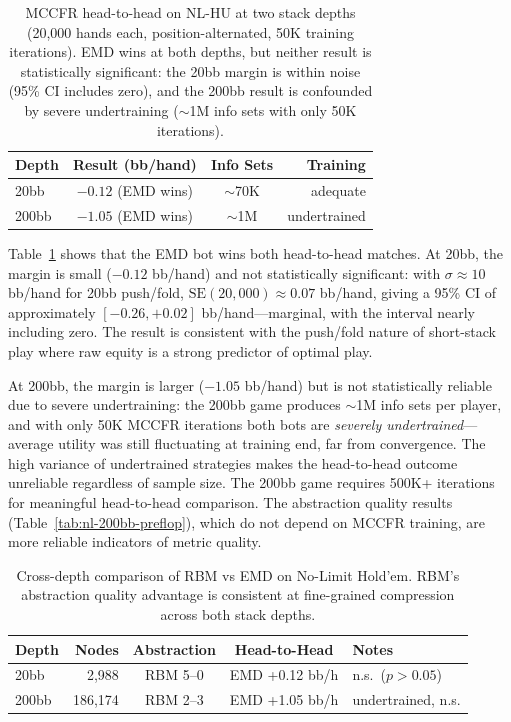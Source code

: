\documentclass[11pt]{article}
\begin{document}
\begin{table}[t]
\centering
\caption{MCCFR head-to-head on NL-HU at two stack depths (20{,}000
hands each, position-alternated, 50K training iterations). EMD wins at
both depths, but neither result is statistically significant: the 20bb
margin is within noise (95\% CI includes zero), and the 200bb result is
confounded by severe undertraining (${\sim}$1M info sets with only 50K
iterations).}
\label{tab:nl-cfr}
\begin{tabular}{lccr}
\toprule
Depth & Result (bb/hand) & Info Sets & Training \\
\midrule
20bb & $-0.12$ (EMD wins) & ${\sim}$70K & adequate \\
200bb & $-1.05$ (EMD wins) & ${\sim}$1M & undertrained \\
\bottomrule
\end{tabular}
\end{table}

Table~\ref{tab:nl-cfr} shows that the EMD bot wins both head-to-head
matches. At 20bb, the margin is small ($-0.12$ bb/hand) and not
statistically significant: with $\sigma \approx 10$ bb/hand for 20bb
push/fold, $\mathrm{SE}(20{,}000) \approx 0.07$ bb/hand, giving a
95\% CI of approximately $[-0.26, +0.02]$ bb/hand---marginal, with the
interval nearly including zero. The result is consistent with the
push/fold nature of short-stack play where raw equity is a strong
predictor of optimal play.

At 200bb, the margin is larger ($-1.05$ bb/hand) but is not
statistically reliable due to severe undertraining: the 200bb game
produces ${\sim}$1M info sets per player, and with only 50K MCCFR
iterations both bots are \emph{severely undertrained}---average utility
was still fluctuating at training end, far from convergence. The high
variance of undertrained strategies makes the head-to-head outcome
unreliable regardless of sample size. The 200bb game requires 500K+
iterations for meaningful head-to-head comparison.
The abstraction quality results (Table~\ref{tab:nl-200bb-preflop}),
which do not depend on MCCFR training, are more reliable indicators of
metric quality.

\begin{table}[t]
\centering
\caption{Cross-depth comparison of RBM vs EMD on No-Limit Hold'em.
RBM's abstraction quality advantage is consistent at fine-grained
compression across both stack depths.}
\label{tab:nl-cross-depth}
\begin{tabular}{lrccl}
\toprule
Depth & Nodes & Abstraction & Head-to-Head & Notes \\
\midrule
20bb & 2{,}988 & RBM 5--0 & EMD +0.12 bb/h & n.s.\ ($p > 0.05$) \\
200bb & 186{,}174 & RBM 2--3 & EMD +1.05 bb/h & undertrained, n.s. \\
\bottomrule
\end{tabular}
\end{table}
\end{document}
